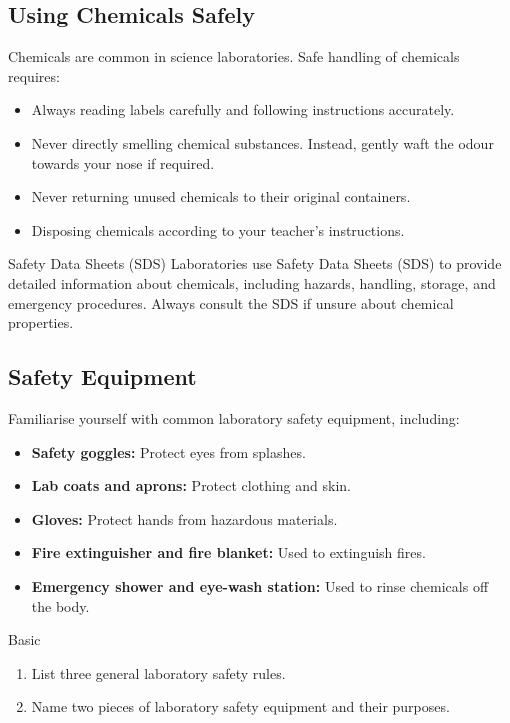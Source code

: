 \subsection{Using Chemicals Safely}

Chemicals are common in science laboratories. Safe handling of chemicals requires:

\begin{itemize}
    \item Always reading labels carefully and following instructions accurately.
    \item Never directly smelling chemical substances. Instead, gently waft the odour towards your nose if required.
    \item Never returning unused chemicals to their original containers.
    \item Disposing chemicals according to your teacher's instructions.
\end{itemize}

\begin{keyconcept}{Safety Data Sheets (SDS)}
Laboratories use Safety Data Sheets (SDS) to provide detailed information about chemicals, including hazards, handling, storage, and emergency procedures. Always consult the SDS if unsure about chemical properties.
\end{keyconcept}

\subsection{Safety Equipment}

Familiarise yourself with common laboratory safety equipment, including:

\begin{itemize}
    \item \textbf{Safety goggles:} Protect eyes from splashes.
    \item \textbf{Lab coats and aprons:} Protect clothing and skin.
    \item \textbf{Gloves:} Protect hands from hazardous materials.
    \item \textbf{Fire extinguisher and fire blanket:} Used to extinguish fires.
    \item \textbf{Emergency shower and eye-wash station:} Used to rinse chemicals off the body.
\end{itemize}

\begin{tieredquestions}{Basic}
\begin{enumerate}
    \item List three general laboratory safety rules.
    \item Name two pieces of laboratory safety equipment and their purposes.
\end{enumerate}
\end{tieredquestions}

